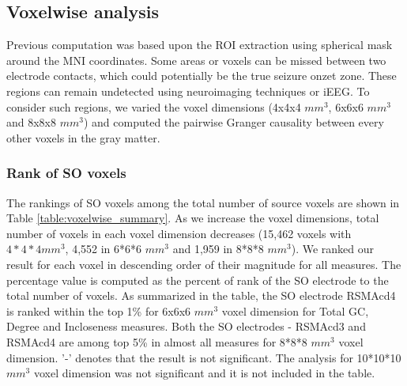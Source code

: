 \subsection{Voxelwise analysis}
Previous computation was based upon the ROI extraction using spherical mask around the MNI coordinates. Some areas or voxels can be missed between two electrode contacts, which could potentially be the true seizure onzet zone. These regions can remain undetected using neuroimaging techniques or iEEG. To consider such regions, we varied the voxel dimensions (4x4x4 $mm^3$, 6x6x6 $mm^3$ and 8x8x8 $mm^3$) and computed the pairwise Granger causality between every other voxels in the gray matter.

\subsubsection{Rank of SO voxels}
The rankings of SO voxels among the total number of source voxels are shown in Table \ref{table:voxelwise_summary}. As we increase the voxel dimensions, total number of voxels in each voxel dimension decreases (15,462 voxels with $4*4*4mm^3$, 4,552 in 6*6*6 $mm^3$ and 1,959 in 8*8*8 $mm^3$). We ranked our result for each voxel in descending order of their magnitude for all measures. The percentage value is computed as the percent of rank of the SO electrode to the total number of voxels. As summarized in the table, the SO electrode RSMAcd4 is ranked within the top 1\% for 6x6x6 $mm^3$ voxel dimension for Total GC, Degree and Incloseness measures. Both the SO electrodes - RSMAcd3 and RSMAcd4 are among top 5\% in almost all measures for 8*8*8 $mm^3$ voxel dimension. '-' denotes that the result is not significant. The analysis for 10*10*10 $mm^3$ voxel dimension was not significant and it is not included in the table.


